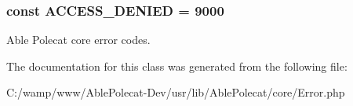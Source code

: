 \subsubsection[{A\+C\+C\+E\+S\+S\+\_\+\+D\+E\+N\+I\+E\+D}]{\setlength{\rightskip}{0pt plus 5cm}const A\+C\+C\+E\+S\+S\+\_\+\+D\+E\+N\+I\+E\+D = 9000}\label{class_able_polecat___error_a58ceb882042acb8eea73d1c9a9b8feff}
Able Polecat core error codes. 

The documentation for this class was generated from the following file\+:\begin{DoxyCompactItemize}
\item 
C\+:/wamp/www/\+Able\+Polecat-\/\+Dev/usr/lib/\+Able\+Polecat/core/Error.\+php\end{DoxyCompactItemize}
